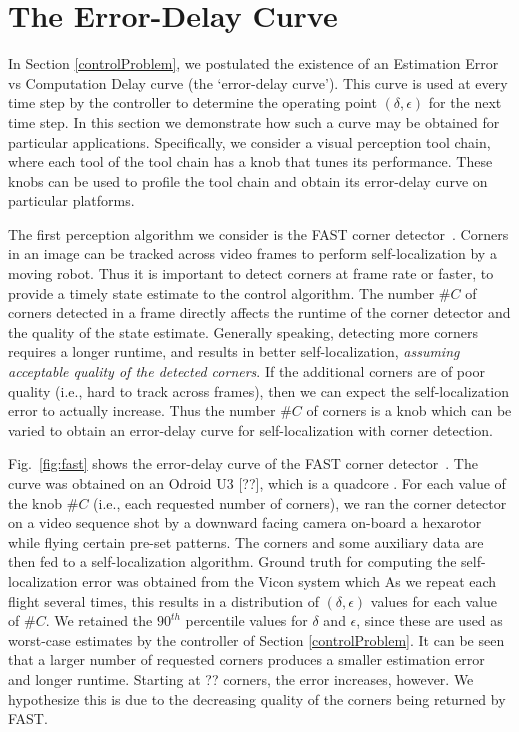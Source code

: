 \section{The Error-Delay Curve}
\label{delayErrorCurve}

In Section \ref{controlProblem}, we postulated the existence of an Estimation Error vs Computation Delay curve (the `error-delay curve').
This curve is used at every time step by the controller to determine the operating point $(\delta, \epsilon)$ for the next time step.
In this section we demonstrate how such a curve may be obtained for particular applications. 
Specifically, we consider a visual perception tool chain, where each tool of the tool chain has a knob that tunes its performance.
These knobs can be used to profile the tool chain and obtain its error-delay curve on particular platforms.

The first perception algorithm we consider is the FAST corner detector~\cite{rosten_2006_machine}.
Corners in an image can be tracked across video frames to perform self-localization by a moving robot. 
Thus it is important to detect corners at frame rate or faster, to provide a timely state estimate to the control algorithm.
The number $\#C$ of corners detected in a frame directly affects the runtime of the corner detector and the quality of the state estimate.
Generally speaking, detecting more corners requires a longer runtime, and results in better self-localization, \emph{assuming acceptable quality of the detected corners}.
If the additional corners are of poor quality (i.e., hard to track across frames), then we can expect the self-localization error to actually increase.
Thus the number $\#C$ of corners is a knob which can be varied to obtain an error-delay curve for self-localization with corner detection. 

Fig.~\ref{fig:fast} shows the error-delay curve of the FAST corner detector~\cite{rosten_2006_machine}.
The curve was obtained on an Odroid U3 [??], which is a quadcore .
For each value of the knob $\#C$ (i.e., each requested number of corners), we ran the corner detector on a video sequence shot by a downward facing camera on-board a hexarotor while flying certain pre-set patterns.
The corners and some auxiliary data are then fed to a self-localization algorithm.
Ground truth for computing the self-localization error was obtained from the Vicon system which 
As we repeat each flight several times, this results in a distribution of $(\delta,\epsilon)$ values for each value of $\#C$. 
We retained the $90^{th}$ percentile values for $\delta$ and $\epsilon$, since these are used as worst-case estimates by the controller of Section \ref{controlProblem}.
It can be seen that a larger number of requested corners produces a smaller estimation error and longer runtime.
Starting at ?? corners, the error increases, however.
We hypothesize this is due to the decreasing quality of the corners being returned by FAST.

